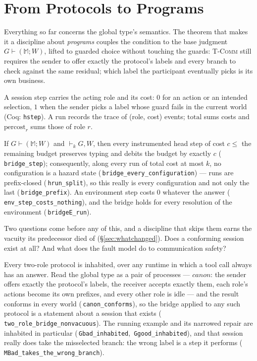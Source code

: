 \documentclass[a4paper,UKenglish,cleveref,autoref,thm-restate,anonymous]{lipics-v2021}
\newcommand{\MM}{\mathbb{M}}
\newcommand{\safeT}[1]{\vdash_{#1}}
\newcommand{\coqok}[1]{\textcolor{okgreen}{\ding{51}}\,\texttt{\small #1}}
\begin{document}
\section{From Protocols to Programs}\label{sec:bridge}

Everything so far concerns the global type's semantics. The theorem that makes
it a discipline about \emph{programs} couples the condition to the base
judgment $G\vdash(\MM;W)$, lifted to guarded choice without touching the
guards: \textsc{T-Comm} still requires the sender to offer exactly the
protocol's labels and every branch to check against the same residual; which
label the participant eventually picks is its own business.

\begin{definition}
A session step carries the acting role and its cost: $0$ for an action or an
intended selection, $1$ when the sender picks a label whose guard fails in the
current world (Coq: \texttt{hstep}). A run records the trace of (role, cost)
events; $\mathrm{total}$ sums costs and $\mathrm{percost}_r$ sums those of role
$r$.
\end{definition}

\begin{theorem}[Bridge]\label{thm:bridge}
If $G\vdash(\MM;W)$ and $\safeT{k} G,W$, then every instrumented head step of
cost $c\le$ the remaining budget preserves typing and debits the budget by
exactly $c$ (\coqok{bridge\_step}); consequently, along every run of total
cost at most $k$, no configuration is a hazard state
(\coqok{bridge\_every\_configuration}) --- runs are prefix-closed
(\coqok{hrun\_split}), so this really is every configuration and not only the
last (\coqok{bridge\_prefix}). An environment step costs $0$ whatever the
answer (\coqok{env\_step\_costs\_nothing}), and the bridge holds for every
resolution of the environment (\coqok{bridgeE\_run}).
\end{theorem}

Two questions come before any of this, and a discipline that skips them earns
the vacuity its predecessor died of (\S\ref{sec:whatchanged}). Does a
conforming session exist at all? And what does the fault model do to
communication safety?

\begin{theorem}\label{thm:inhabited}
Every two-role protocol is inhabited, over any runtime in which a tool call
always has an answer. Read the global type as a pair of processes ---
$\mathit{canon}$: the sender offers exactly the protocol's labels, the receiver
accepts exactly them, each role's actions become its own prefixes, and every
other role is idle --- and the result conforms in every world
(\coqok{canon\_conforms}), so the bridge applied to any such protocol is a
statement about a session that exists
(\coqok{two\_role\_bridge\_nonvacuous}). The running example and its narrowed
repair are inhabited in particular (\coqok{Gbad\_inhabited},
\coqok{Ggood\_inhabited}), and that session really does take the misselected
branch: the wrong label is a step it performs
(\coqok{MBad\_takes\_the\_wrong\_branch}).
\end{theorem}
\end{document}
